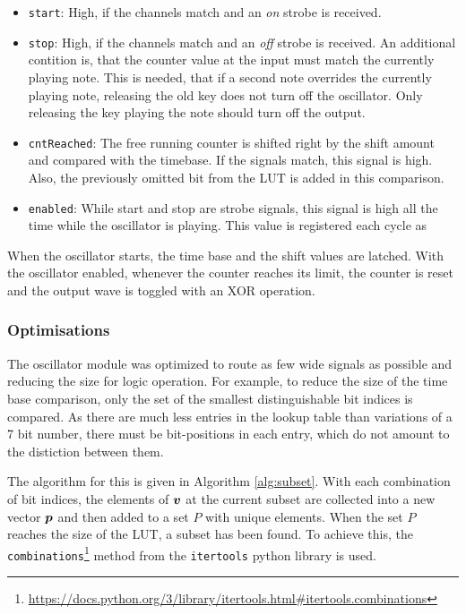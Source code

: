 \begin{itemize}
	\item \texttt{start}: High, if the channels match and an \emph{on} strobe is received.
	      
	\item \texttt{stop}: High, if the channels match and an \emph{off} strobe is received. An additional contition is, that the counter value at the input must match the currently playing note. This is needed, that if a second note overrides the currently playing note, releasing the old key does not turn off the oscillator. Only releasing the key playing the note should turn off the output.
	      
	\item \texttt{cntReached}: The free running counter is shifted right by the shift amount and compared with the timebase. If the signals match, this signal is high. Also, the previously omitted bit from the LUT is added in this comparison.
	      
	\item \texttt{enabled}: While start and stop are strobe signals, this signal is high all the time while the oscillator is playing. This value is registered each cycle as
	      
\end{itemize}

When the oscillator starts, the time base and the shift values are latched. With the oscillator enabled, whenever the counter reaches its limit, the counter is reset and the output wave is toggled with an XOR operation.

\subsubsection{Optimisations}

The oscillator module was optimized to route as few wide signals as possible and reducing the size for logic operation. For example, to reduce the size of the time base comparison, only the set of the smallest distinguishable bit indices is compared. As there are much less entries in the lookup table than variations of a 7 bit number, there must be bit-positions in each entry, which do not amount to the distiction between them.

The algorithm for this is given in Algorithm \ref{alg:subset}. With each combination of bit indices, the elements of $\bm{v}$ at the current subset are collected into a new vector $\bm{p}$ and then added to a set $P$ with unique elements. When the set $P$ reaches the size of the \acs{LUT}, a subset has been found. To achieve this, the \texttt{combinations}\footnote{\url{https://docs.python.org/3/library/itertools.html\#itertools.combinations}} method from the \texttt{itertools} python library is used.

